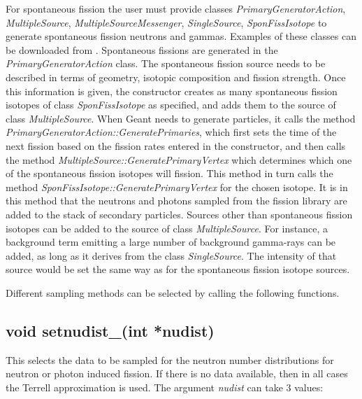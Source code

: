 \documentclass[11pt]{article}
\begin{document}
For spontaneous fission the user must provide classes {\it
PrimaryGeneratorAction}, {\it MultipleSource}, {\it
MultipleSourceMessenger}, {\it SingleSource}, {\it SponFissIsotope} to
generate spontaneous fission neutrons and gammas. Examples of these
classes can be downloaded from \httpnuclear. Spontaneous fissions are
generated in the {\it PrimaryGeneratorAction} class.
The spontaneous fission
source needs to be described in terms of geometry, isotopic
composition and fission strength. Once this information is given, the
constructor creates as many spontaneous fission isotopes of class {\it
SponFissIsotope} as specified, and adds them to the source of class
{\it MultipleSource}. When Geant needs to generate particles, it calls
the method {\it PrimaryGeneratorAction::GeneratePrimaries}, which
first sets the time of the next fission based on the fission rates
entered in the constructor, and then calls the method {\it
MultipleSource::GeneratePrimaryVertex} which determines which one of
the spontaneous fission isotopes will fission. This method in turn
calls the method {\it SponFissIsotope::GeneratePrimaryVertex} for the
chosen isotope. It is in this method that the neutrons and photons
sampled from the fission library are added to the stack of secondary
particles.  Sources other than spontaneous fission isotopes can be
added to the source of class {\it MultipleSource}. For instance, a
background term emitting a large number of background gamma-rays can
be added, as long as it derives from the class {\it SingleSource}. The
intensity of that source would be set the same way as for the
spontaneous fission isotope sources.

Different sampling methods can be selected by calling the following functions.
\subsection*{void setnudist\_(int *nudist)
\label{setnudist}}

This selects the data to be sampled for the neutron number
distributions for neutron or photon induced fission. If there is no data
available, then in all cases the Terrell approximation is used.
The argument \textit{nudist} can take 3 values:
\end{document}
